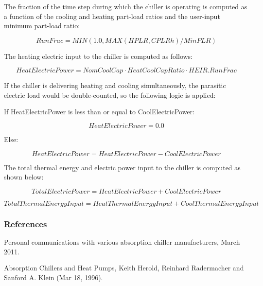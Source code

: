 The fraction of the time step during which the chiller is operating is computed as a function of the cooling and heating part-load ratios and the user-input minimum part-load ratio:

\begin{equation}
RunFrac = MIN(1.0,MAX\left( {HPLR,CPLRh} \right)/MinPLR)
\end{equation}

The heating electric input to the chiller is computed as follows:

\begin{equation}
HeatElectricPower = NomCoolCap \cdot HeatCoolCapRatio \cdot HEIR.RunFrac
\end{equation}

If the chiller is delivering heating and cooling simultaneously, the parasitic electric load would be double-counted, so the following logic is applied:

If HeatElectricPower is less than or equal to CoolElectricPower:

\begin{equation}
  HeatElectricPower = 0.0
\end{equation}

Else:

\begin{equation}
  HeatElectricPower = HeatElectricPower - CoolElectricPower
\end{equation}

The total thermal energy and electric power input to the chiller is computed as shown below:

\begin{equation}
TotalElectricPower = HeatElectricPower + CoolElectricPower
\end{equation}

\begin{equation}
TotalThermalEnergyInput = HeatThermalEnergyInput + CoolThermalEnergyInput
\end{equation}

\subsubsection{References}\label{references-009}

Personal communications with various absorption chiller manufacturers, March 2011.

Absorption Chillers and Heat Pumps, Keith Herold, Reinhard Radermacher and Sanford A. Klein (Mar 18, 1996).

